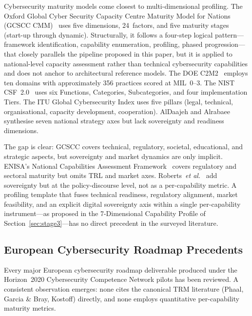 Cybersecurity maturity models come closest to multi-dimensional
profiling. The Oxford Global Cyber Security Capacity Centre Maturity
Model for Nations (GCSCC CMM)~\cite{gcscc_cmm} uses five dimensions,
24~factors, and five maturity stages (start-up through dynamic).
Structurally, it follows a four-step logical pattern---framework
identification, capability enumeration, profiling,
phased progression---that closely parallels the pipeline proposed in this
paper, but it is applied to national-level capacity assessment rather
than technical cybersecurity capabilities and does not anchor to
architectural reference models. The DOE C2M2~\cite{doe_c2m2} employs
ten domains with approximately 356 practices scored at MIL~0--3. The
NIST CSF~2.0~\cite{nist_csf2} uses six Functions, Categories,
Subcategories, and four implementation Tiers. The ITU Global
Cybersecurity Index uses five pillars (legal, technical, organisational,
capacity development, cooperation). AlDaajeh and
Alrabaee~\cite{aldaajeh2024} synthesise seven national strategy axes
but lack sovereignty and readiness dimensions.

The gap is clear: GCSCC covers technical, regulatory, societal,
educational, and strategic aspects, but sovereignty and market dynamics
are only implicit. ENISA's National Capabilities Assessment
Framework~\cite{enisa_ncaf} covers regulatory and sectoral maturity but
omits TRL and market axes. Roberts~\textit{et al.}~\cite{roberts2021}
add sovereignty but at the policy-discourse level, not as a
per-capability metric. A profiling template that fuses technical
readiness, regulatory alignment, market feasibility, and an explicit
digital sovereignty axis within a single per-capability instrument---as
proposed in the 7-Dimensional Capability Profile of
Section~\ref{sec:stage3}---has no direct precedent in the surveyed
literature.

\subsection{European Cybersecurity Roadmap Precedents}
\label{sec:rw_eu}

Every major European cybersecurity roadmap deliverable produced under the
Horizon~2020 Cybersecurity Competence Network pilots has been reviewed.
A consistent observation emerges: none cites the canonical TRM
literature (Phaal, Garcia \& Bray, Kostoff) directly, and none employs
quantitative per-capability maturity metrics.

